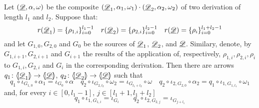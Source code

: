 \begin{lemma}\label{rem:dett}
	Let $(\underline{\mathscr{D}}, \alpha, \omega)$ be the composite $(\underline{\mathscr{D}}_1, \alpha_1, \omega_1)\cdot (\underline{\mathscr{D}}_2, \alpha_2, \omega_2)$ of two derivation of length $l_1$ and $l_2$. Suppose that:
	\[r(\underline{\mathscr{D}}_1)=\{\rho_{1,i}\}_{i=0}^{l_1-1} \quad r(\underline{\mathscr{D}}_2)=\{\rho_{2,i}\}_{i=0}^{l_2-1} \quad  r(\underline{\mathscr{D}})=\{\rho_{i}\}_{i=0}^{l_1+l_2-1}\]
	and let  $G_{1,0}, G_{2,0}$ and $G_{0}$ be the sources of $\underline{\mathscr{D}}_1$, $\underline{\mathscr{D}}_2$,  and $\underline{\mathscr{D}}$. Similary, denote, by $G_{1,i+1}, G_{2,i+1}$ and $G_{i+1}$ the results of the application of, respectively, $\rho_{1,i}, \rho_{2,i}, \rho_i$ to $G_{1,i}, G_{2,i}$ and $G_{i}$  in the corresponding derivation. Then there are arrows $q_1\colon \langle \hspace{-1.85pt}[ \underline{\mathscr{D}}_1]\hspace{-1.85pt}\rangle \to \langle \hspace{-1.85pt}[ \underline{\mathscr{D}}]\hspace{-1.85pt}\rangle$, $q_2\colon \langle \hspace{-1.85pt}[ \underline{\mathscr{D}}_2]\hspace{-1.85pt}\rangle \to \langle \hspace{-1.85pt}[ \underline{\mathscr{D}}]\hspace{-1.85pt}\rangle$ such that
	\[ q_1\circ \iota_{G_{1,0}}\circ \alpha_1 = \iota_{G_{0}}\circ \alpha \quad  q_2\circ \iota_{G_{2,l_2}}\circ \omega_2 = \iota_{G_{l_1+l_2}}\circ \omega \quad 	q_2\circ \iota_{2, G_{2,0}} \circ \alpha_2=q_1\circ \iota_{1, G_{1, l_1}}\circ \omega_1\]
	and, for every $i\in [0, l_1-1]$, $j\in [l_1+1, l_1+l_2]$
	\[q_1\circ \iota_{1, G_{1,i}}=\iota_{G_{i}}\qquad q_2\circ \iota_{2, G_{2,j}}=\iota_{G_{j+l_1}} \]
\end{lemma}
